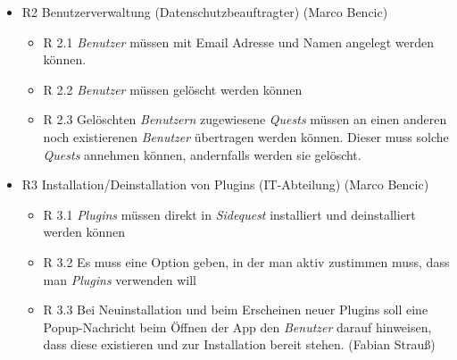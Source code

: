 \documentclass{article}
\begin{document}
\begin{itemize}
\item R2 Benutzerverwaltung (Datenschutzbeauftragter) (Marco Bencic)
    \begin{itemize}
        \item R 2.1 \textit{Benutzer} müssen mit Email Adresse und Namen angelegt werden können.
        \item R 2.2 \textit{Benutzer} müssen gelöscht werden können
        \item R 2.3 Gelöschten \textit{Benutzern} zugewiesene \textit{Quests} müssen an einen anderen noch existierenen \textit{Benutzer} übertragen werden können. Dieser muss solche \textit{Quests} annehmen können, andernfalls werden sie gelöscht. 
    \end{itemize}
\item R3 Installation/Deinstallation von Plugins (IT-Abteilung) (Marco Bencic)
    \begin{itemize}
        \item R 3.1 \textit{Plugins} müssen direkt in \textit{Sidequest} installiert und deinstalliert werden können 
        \item R 3.2 Es muss eine Option geben, in der man aktiv zustimmen muss, dass man \textit{Plugins} verwenden will
        \item R 3.3 Bei Neuinstallation und beim Erscheinen neuer Plugins soll eine Popup-Nachricht beim Öffnen der App den \textit{Benutzer} darauf hinweisen, dass diese existieren und zur Installation bereit stehen. (Fabian Strauß)
    \end{itemize}


\end{itemize}
\end{document}

